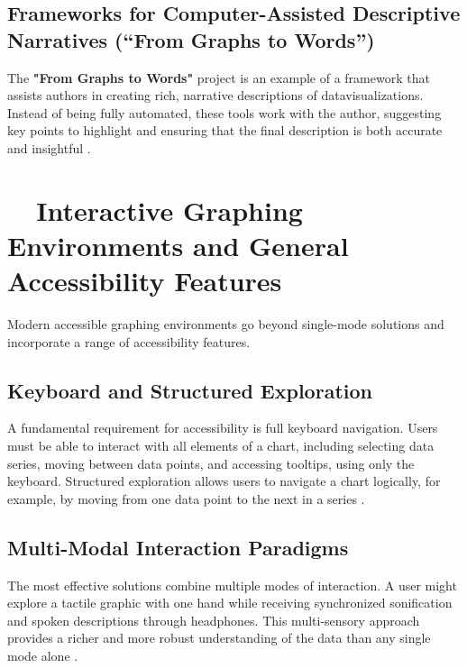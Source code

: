 \subsection{Frameworks for Computer-Assisted Descriptive Narratives (``From Graphs to Words'')}\label{ch13:ssec:descriptive-narratives}
The \textbf{"From Graphs to Words"} project is an example of a framework that assists authors in creating rich, narrative descriptions of \gls{datavisualization}s. Instead of being fully automated, these tools work with the author, suggesting key points to highlight and ensuring that the final description is both accurate and insightful \supercite{FromGraphsToWords}.

\section{~~Interactive Graphing Environments and General Accessibility Features}\label{ch13:sec:interactive-environments}
Modern accessible graphing environments go beyond single-mode solutions and incorporate a range of accessibility features.

\subsection{Keyboard  and Structured Exploration}\label{ch13:ssec:keyboard-navigation}
A fundamental requirement for accessibility is full keyboard navigation. Users must be able to interact with all elements of a chart, including selecting data series, moving between data points, and accessing tooltips, using only the keyboard. Structured exploration allows users to navigate a chart logically, for example, by moving from one data point to the next in a series \supercite{AutoVizuA11y}.

\subsection{Multi-Modal Interaction Paradigms}\label{ch13:ssec:multi-modal}
The most effective solutions combine multiple modes of interaction. A user might explore a tactile graphic with one hand while receiving synchronized sonification and spoken descriptions through headphones. This multi-sensory approach provides a richer and more robust understanding of the data than any single mode alone \supercite{RichScreenReaderExperiences, ReindersAccessibleData}.

